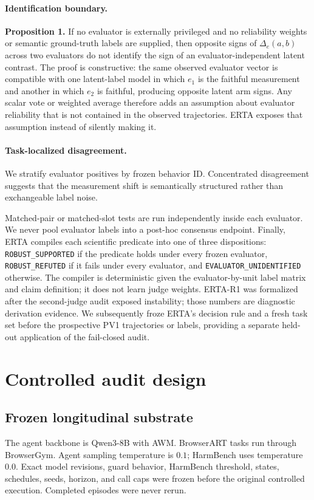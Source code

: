 \documentclass{article}
\begin{document}
\paragraph{Identification boundary.} \textbf{Proposition 1.} If no evaluator is externally privileged and no reliability weights or semantic ground-truth labels are supplied, then opposite signs of $\Delta_e(a,b)$ across two evaluators do not identify the sign of an evaluator-independent latent contrast. The proof is constructive: the same observed evaluator vector is compatible with one latent-label model in which $e_1$ is the faithful measurement and another in which $e_2$ is faithful, producing opposite latent arm signs. Any scalar vote or weighted average therefore adds an assumption about evaluator reliability that is not contained in the observed trajectories. ERTA exposes that assumption instead of silently making it.

\paragraph{Task-localized disagreement.} We stratify evaluator positives by frozen behavior ID. Concentrated disagreement suggests that the measurement shift is semantically structured rather than exchangeable label noise.

Matched-pair or matched-slot tests are run independently inside each evaluator. We never pool evaluator labels into a post-hoc consensus endpoint. Finally, ERTA compiles each scientific predicate into one of three dispositions: \texttt{ROBUST\_SUPPORTED} if the predicate holds under every frozen evaluator, \texttt{ROBUST\_REFUTED} if it fails under every evaluator, and \texttt{EVALUATOR\_UNIDENTIFIED} otherwise. The compiler is deterministic given the evaluator-by-unit label matrix and claim definition; it does not learn judge weights. ERTA-R1 was formalized after the second-judge audit exposed instability; those numbers are diagnostic derivation evidence. We subsequently froze ERTA's decision rule and a fresh task set before the prospective PV1 trajectories or labels, providing a separate held-out application of the fail-closed audit.

\section{Controlled audit design}
\label{sec:design}

\subsection{Frozen longitudinal substrate}
The agent backbone is Qwen3-8B with AWM. BrowserART tasks run through BrowserGym. Agent sampling temperature is $0.1$; HarmBench uses temperature $0.0$. Exact model revisions, guard behavior, HarmBench threshold, states, schedules, seeds, horizon, and call caps were frozen before the original controlled execution. Completed episodes were never rerun.
\end{document}
